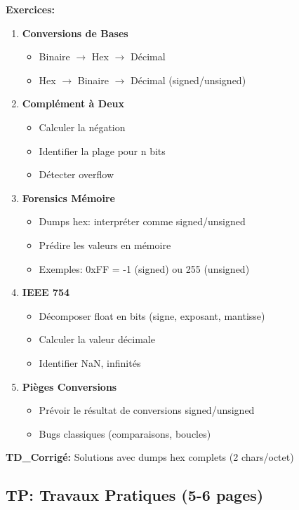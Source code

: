 \documentclass[10pt,a4paper]{article}
\begin{document}
\textbf{Exercices:}
\begin{enumerate}
\item \textbf{Conversions de Bases}
   \begin{itemize}
   \item Binaire $\rightarrow$ Hex $\rightarrow$ Décimal
   \item Hex $\rightarrow$ Binaire $\rightarrow$ Décimal (signed/unsigned)
   \end{itemize}

\item \textbf{Complément à Deux}
   \begin{itemize}
   \item Calculer la négation
   \item Identifier la plage pour n bits
   \item Détecter overflow
   \end{itemize}

\item \textbf{Forensics Mémoire}
   \begin{itemize}
   \item Dumps hex: interpréter comme signed/unsigned
   \item Prédire les valeurs en mémoire
   \item Exemples: 0xFF = -1 (signed) ou 255 (unsigned)
   \end{itemize}

\item \textbf{IEEE 754}
   \begin{itemize}
   \item Décomposer float en bits (signe, exposant, mantisse)
   \item Calculer la valeur décimale
   \item Identifier NaN, infinités
   \end{itemize}

\item \textbf{Pièges Conversions}
   \begin{itemize}
   \item Prévoir le résultat de conversions signed/unsigned
   \item Bugs classiques (comparaisons, boucles)
   \end{itemize}
\end{enumerate}

\textbf{TD\_Corrigé:} Solutions avec dumps hex complets (2 chars/octet)

\subsection*{TP: Travaux Pratiques (5-6 pages)}
\end{document}
